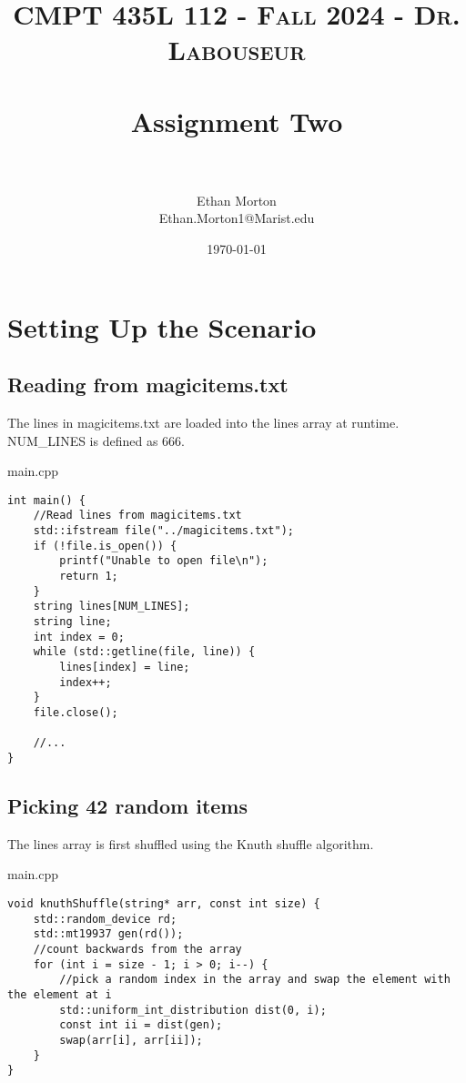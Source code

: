 \documentclass[letterpaper, 10pt,DIV=13]{scrartcl}
\title{
   \normalfont \normalsize
   \textsc{CMPT 435L 112 - Fall 2024 - Dr. Labouseur} \\[10pt] %
   \horrule{0.5pt} \\[0.25cm] 	%
   \huge Assignment Two  \\     	    %
   \horrule{0.5pt} \\[0.25cm] 	%
}
\author{Ethan Morton \\ \normalsize Ethan.Morton1@Marist.edu}
\date{\normalsize\today} 	%
\numberwithin{equation}{section} %
\numberwithin{figure}{section} %
\numberwithin{table}{section} %
\begin{document}
\maketitle %

\section{Setting Up the Scenario}
\subsection{Reading from magicitems.txt}

The lines in magicitems.txt are loaded into the lines array at runtime.
NUM\_LINES is defined as 666.

main.cpp
\begin{verbatim}
int main() {
    //Read lines from magicitems.txt
    std::ifstream file("../magicitems.txt");
    if (!file.is_open()) {
        printf("Unable to open file\n");
        return 1;
    }
    string lines[NUM_LINES];
    string line;
    int index = 0;
    while (std::getline(file, line)) {
        lines[index] = line;
        index++;
    }
    file.close();

    //...
}
\end{verbatim}

\subsection{Picking 42 random items}

The lines array is first shuffled using the Knuth shuffle algorithm.

main.cpp
\begin{verbatim}
void knuthShuffle(string* arr, const int size) {
    std::random_device rd;
    std::mt19937 gen(rd());
    //count backwards from the array
    for (int i = size - 1; i > 0; i--) {
        //pick a random index in the array and swap the element with the element at i
        std::uniform_int_distribution dist(0, i);
        const int ii = dist(gen);
        swap(arr[i], arr[ii]);
    }
}
\end{verbatim}
\end{document}
